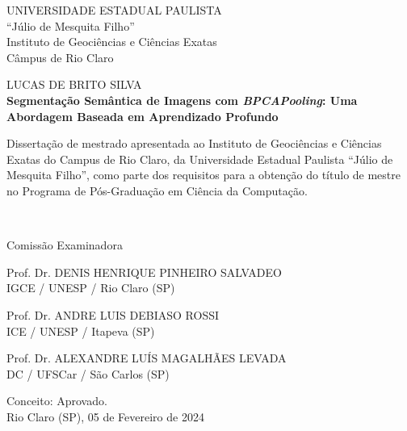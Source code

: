 \newpage
\thispagestyle{empty}

\begin{center}
    UNIVERSIDADE ESTADUAL PAULISTA\\
    “Júlio de Mesquita Filho”\\
    Instituto de Geociências e Ciências Exatas\\
    Câmpus de Rio Claro
    
    \vspace{1.5cm}
    {LUCAS DE BRITO SILVA\\}
    \vspace{1.5cm}
    \textbf{Segmentação Semântica de Imagens com \textit{BPCAPooling}: Uma Abordagem Baseada em Aprendizado Profundo}
    
    \vspace{1.5cm}
    
    \hspace{.45\linewidth}
    \begin{minipage}{.50\linewidth}
    \small
        Dissertação de mestrado apresentada ao Instituto de Geociências e Ciências Exatas do Campus de Rio Claro, da Universidade Estadual Paulista ``Júlio de Mesquita Filho'', como parte dos requisitos para a obtenção do título de mestre no Programa de Pós-Graduação em Ciência da Computação.
    \end{minipage} \\
    \normalsize
    
    \vspace{1cm}
    
    Comissão Examinadora\\
    
    \vspace{0.7cm}

    Prof. Dr. DENIS HENRIQUE PINHEIRO SALVADEO\\
    IGCE / UNESP / Rio Claro (SP)\\
    \vspace{0.25cm}


    Prof. Dr. ANDRE LUIS DEBIASO ROSSI\\
    ICE / UNESP / Itapeva (SP)\\
    \vspace{0.25cm}


    Prof. Dr. ALEXANDRE LUÍS MAGALHÃES LEVADA\\
    DC / UFSCar / São Carlos (SP) \\
    \vspace{0.25cm}


    Conceito: Aprovado. \\

    
    \vspace{1.5cm}
    Rio Claro (SP), 05 de Fevereiro de 2024
\end{center}